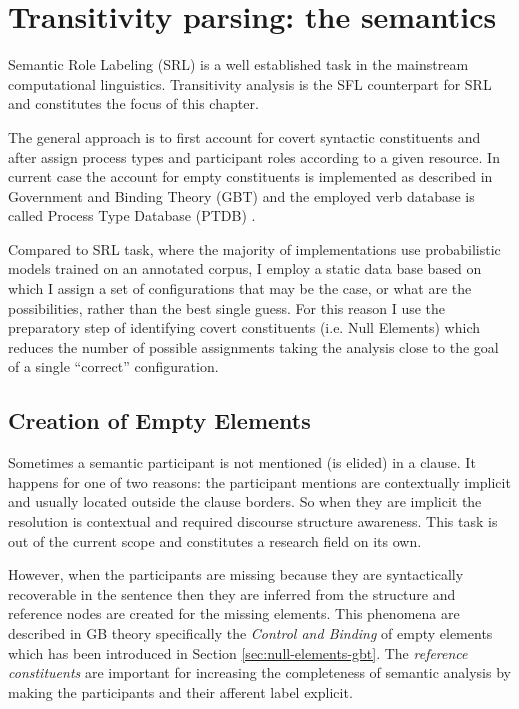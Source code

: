 \chapter{Transitivity parsing: the semantics}
\label{ch:semantic-parsing}

Semantic Role Labeling (SRL) is a well established task in the mainstream computational linguistics. Transitivity analysis is the SFL counterpart for SRL and constitutes the focus of this chapter. 

The general approach is to first account for covert syntactic constituents and after assign process types and participant roles according to a given resource. In current case the account for empty constituents is implemented as described in Government and Binding Theory (GBT) \citep{Haegeman1991} and the employed verb database is called Process Type Database (PTDB) \citep{Neale2002}. 

Compared to SRL task, where the majority of implementations use probabilistic models trained on an annotated corpus, I employ a static data base based on which I assign a set of configurations that may be the case, or what are the possibilities, rather than the best single guess. For this reason I use the preparatory step of identifying covert constituents (i.e. Null Elements) which reduces the number of possible assignments taking the analysis close to the goal of a single ``correct'' configuration.

\section{Creation of Empty Elements}
\label{sec:creation-empty-elements}
Sometimes a semantic participant is not mentioned (is elided) in a clause. It happens for one of two reasons: the participant mentions are contextually implicit and usually located outside the clause borders. So when they are implicit the resolution is contextual and required discourse structure awareness. This task is out of the current scope and constitutes a research field on its own. 

However, when the participants are missing because they are syntactically recoverable in the sentence then they are inferred from the structure and reference nodes are created for the missing elements. This phenomena are described in GB theory specifically the \textit{Control and Binding} of empty elements \citep{Haegeman1991} which has been introduced in Section \ref{sec:null-elements-gbt}. The \textit{reference constituents} are important for increasing the completeness of semantic analysis by making the participants and their afferent label explicit.

